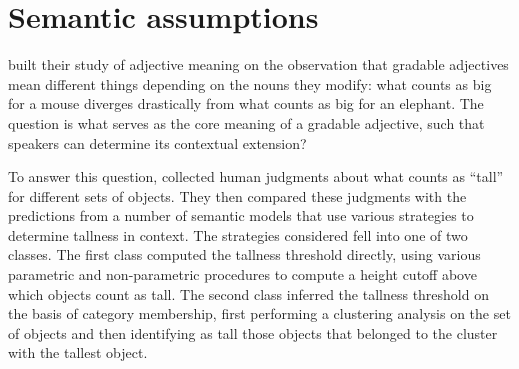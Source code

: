 \documentclass[10pt,a4paper]{article}
\begin{document}
\section{Semantic assumptions}


 built their study of adjective meaning on the observation that gradable adjectives mean different things depending on the nouns they modify: what counts as big for a mouse diverges drastically from what counts as big for an elephant. The question is what serves as the core meaning of a gradable adjective, such that speakers can determine its contextual extension? 
 
To answer this question, \citeauthor{schmidtetal2009} collected human judgments about what counts as ``tall'' for different sets of objects. They then compared these judgments with the predictions from a number of semantic models that use various strategies to determine tallness in context. The strategies considered fell into one of two classes. The first class computed the tallness threshold directly, using various parametric and non-parametric procedures to compute a height cutoff above which objects count as tall. The second class inferred the tallness threshold on the basis of category membership, first performing a clustering analysis on the set of objects and then identifying as tall those objects that belonged to the cluster with the tallest object.
\end{document}
